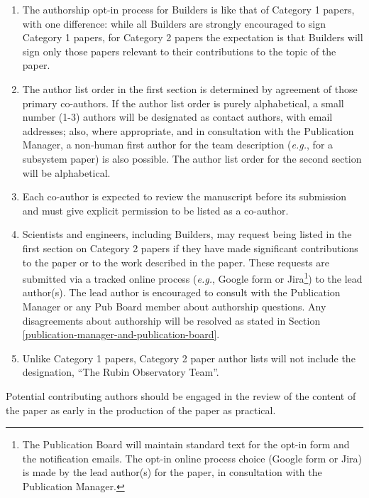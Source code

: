 \begin{enumerate}
\begin{enumerate}
    \begin{enumerate}
    \def\labelenumiii{\roman{enumiii}.}
    \item
      The authorship opt-in process for Builders is like that of Category 1 papers, with one difference: while all Builders are strongly encouraged to sign Category 1 papers, for Category 2 papers the expectation is that Builders will sign only those papers relevant to their contributions to the topic of the paper.
    \item
      The author list order in the first section is determined by agreement of those primary co-authors.
      If the author list order is purely alphabetical, a small number (1-3) authors will be designated as contact authors, with email addresses; also, where appropriate, and in consultation with the Publication Manager, a non-human first author for the team description (\emph{e.g.}, for a subsystem paper) is also possible.
      The author list order for the second section will be alphabetical.
    \item
      Each co-author is expected to review the manuscript before its submission and must give explicit permission to be listed as a co-author.
    \item
      Scientists and engineers, including Builders, may request being listed in the first section on Category 2 papers if they have made significant contributions to the paper or to the work described in the paper.
      These requests are submitted via a tracked online process (\emph{e.g.}, Google form or Jira\footnote{
        The Publication Board will maintain standard text for the opt-in form and the notification emails.
        The opt-in online process choice (Google form or Jira) is made by the lead author(s) for the paper, in consultation with the Publication Manager.
      }) to the lead author(s).
      The lead author is encouraged to consult with the Publication Manager or any Pub Board member about authorship questions.
      Any disagreements about authorship will be resolved as stated in Section \ref{publication-manager-and-publication-board}.
    \item
      Unlike Category 1 papers, Category 2 paper author lists will not include the designation, ``The Rubin Observatory Team''.
    \end{enumerate}
  \end{enumerate}
\end{enumerate}

Potential contributing authors should be engaged in the review of the content of the paper as early in the production of the paper as practical.

